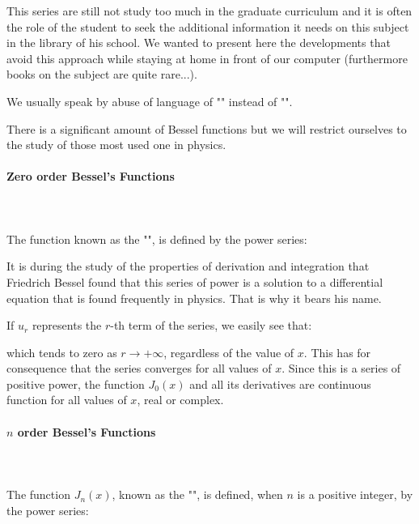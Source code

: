 	This series are still not study too much in the graduate curriculum and it is often the role of the student to seek the additional information it needs on this subject in the library of his school. We wanted to present here the developments that avoid this approach while staying at home in front of our computer (furthermore books on the subject are quite rare...).
	
	\begin{tcolorbox}[title=Remark,colframe=black,arc=10pt]
	We usually speak by abuse of language of "\label{bessel functions}" instead of "".
	\end{tcolorbox}
	There is a significant amount of Bessel functions but we will restrict ourselves to the study of those most used one in physics.
	
	\paragraph{Zero order Bessel's Functions}\mbox{}\\\\
	The function known as the "", is defined by the power series:
	
	It is during the study of the properties of derivation and integration that Friedrich Bessel found that this series of power is a solution to a differential equation that is found frequently in physics. That is why it bears his name.
	
	If $u_r$ represents the $r$-th term of the series, we easily see that:
	
	which tends to zero as $r\rightarrow +\infty$, regardless of the value of $x$. This has for consequence that the series converges for all values of $x$. Since this is a series of positive power, the function $J_0(x)$ and all its derivatives are continuous function for all values of $x$, real or complex.
	
	\paragraph{$n$ order Bessel's Functions}\mbox{}\\\\
	The function $J_n(x)$, known as the "", is defined, when $n$ is a positive integer, by the power series:
	
